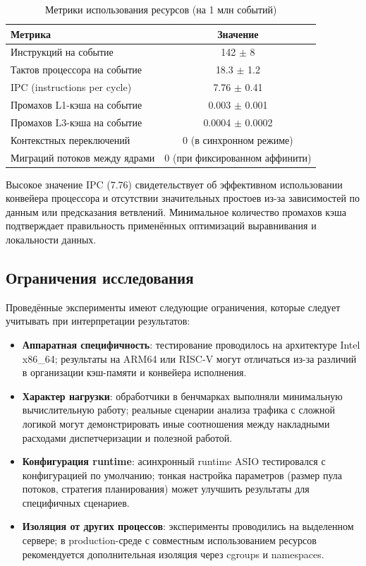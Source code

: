 \begin{table}[H]
\centering
\caption{Метрики использования ресурсов (на 1 млн событий)}
\label{tab:perf_metrics}
\begin{tabular}{lc}
\toprule
\textbf{Метрика} & \textbf{Значение} \\
\midrule
Инструкций на событие & 142 $\pm$ 8 \\
Тактов процессора на событие & 18.3 $\pm$ 1.2 \\
IPC (instructions per cycle) & 7.76 $\pm$ 0.41 \\
Промахов L1-кэша на событие & 0.003 $\pm$ 0.001 \\
Промахов L3-кэша на событие & 0.0004 $\pm$ 0.0002 \\
Контекстных переключений & 0 (в синхронном режиме) \\
Миграций потоков между ядрами & 0 (при фиксированном аффинити) \\
\bottomrule
\end{tabular}
\end{table}

Высокое значение IPC (7.76) свидетельствует об эффективном использовании конвейера процессора и отсутствии значительных простоев из-за зависимостей по данным или предсказания ветвлений. Минимальное количество промахов кэша подтверждает правильность применённых оптимизаций выравнивания и локальности данных.

\subsection{Ограничения исследования}

Проведённые эксперименты имеют следующие ограничения, которые следует учитывать при интерпретации результатов:

\begin{itemize}
    \item \textbf{Аппаратная специфичность}: тестирование проводилось на архитектуре Intel x86\_64; результаты на ARM64 или RISC-V могут отличаться из-за различий в организации кэш-памяти и конвейера исполнения.

    \item \textbf{Характер нагрузки}: обработчики в бенчмарках выполняли минимальную вычислительную работу; реальные сценарии анализа трафика с сложной логикой могут демонстрировать иные соотношения между накладными расходами диспетчеризации и полезной работой.

    \item \textbf{Конфигурация runtime}: асинхронный runtime ASIO тестировался с конфигурацией по умолчанию; тонкая настройка параметров (размер пула потоков, стратегия планирования) может улучшить результаты для специфичных сценариев.

    \item \textbf{Изоляция от других процессов}: эксперименты проводились на выделенном сервере; в production-среде с совместным использованием ресурсов рекомендуется дополнительная изоляция через cgroups и namespaces.
\end{itemize}

